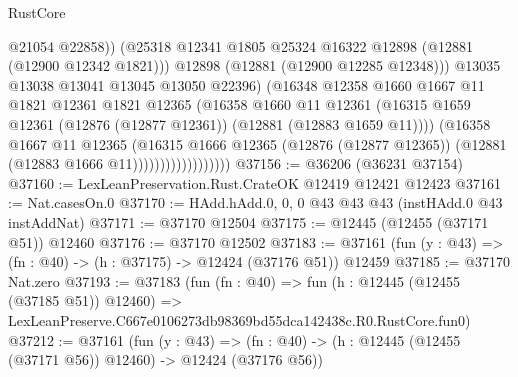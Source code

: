 \begin{lexlean}{RustCore}
\begin{coremodule}
                                      @21054
                                      @22858))
                                  (@25318
                                    @12341
                                    @1805
                                    @25324
                                    @16322
                                    @12898
                                    (@12881 (@12900 @12342 @1821)))
                                  @12898
                                  (@12881 (@12900 @12285 @12348)))
                                @13035
                                @13038
                                @13041
                                @13045
                                @13050
                                @22396)
                              (@16348
                                @12358
                                @1660
                                @1667
                                @11
                                @1821
                                @12361
                                @1821
                                @12365
                                (@16358
                                  @1660
                                  @11
                                  @12361
                                  (@16315
                                    @1659
                                    @12361
                                    (@12876 (@12877 @12361))
                                    (@12881 (@12883 @1659 @11))))
                                (@16358
                                  @1667
                                  @11
                                  @12365
                                  (@16315
                                    @1666
                                    @12365
                                    (@12876 (@12877 @12365))
                                    (@12881 (@12883 @1666 @11))))))))))))))))))
@37156 := @36206 (@36231 @37154)
@37160 := LexLeanPreservation.Rust.CrateOK @12419 @12421 @12423
@37161 := Nat.casesOn.{0}
@37170 := HAdd.hAdd.{0, 0, 0} @43 @43 @43 (instHAdd.{0} @43 instAddNat)
@37171 := @37170 @12504
@37175 := @12445 (@12455 (@37171 @51)) @12460
@37176 := @37170 @12502
@37183 := @37161 (fun (y : @43) => (fn : @40) -> (h : @37175) -> @12424 (@37176 @51)) @12459
@37185 := @37170 Nat.zero
@37193 := @37183
    (fun (fn : @40) =>
    fun (h : @12445 (@12455 (@37185 @51)) @12460) =>
    LexLeanPreserve.C667e0106273db98369bd55dca142438c.R0.RustCore.fun0)
@37212 := @37161
    (fun (y : @43) =>
    (fn : @40) -> (h : @12445 (@12455 (@37171 @56)) @12460) -> @12424 (@37176 @56))

\end{coremodule}
\end{lexlean}
